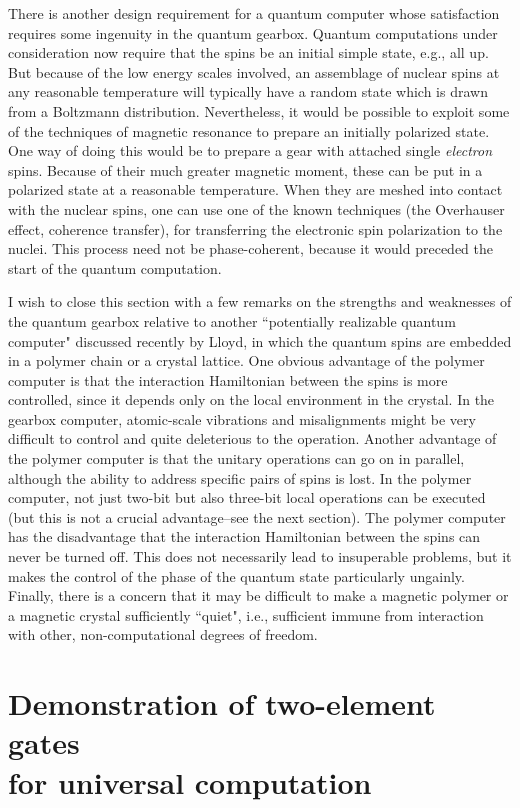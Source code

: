 There is another design requirement for a quantum computer whose satisfaction
requires some ingenuity in
the quantum gearbox.  Quantum computations under consideration
now\cite{Simon,Shor}
require that the spins be an initial simple state,
e.g., all up.  But because of the low energy scales involved, an
assemblage of nuclear spins
at any reasonable temperature
will typically have a random state which is drawn from a Boltzmann
distribution.  Nevertheless, it would be possible to exploit some
of the techniques of magnetic resonance to prepare an initially
polarized state.  One way of doing this would be to prepare a
gear with attached single {\em electron} spins.  Because of their
much greater magnetic moment, these can be put in a polarized state
at a reasonable temperature.  When they are meshed into contact
with the nuclear spins, one can use one of the
known techniques (the
Overhauser effect, coherence transfer\cite{NMR}), for transferring
the electronic spin polarization to the nuclei.  This process
need not be phase-coherent, because it would preceded the start
of the quantum computation.

I wish to close this section with a few remarks on the strengths
and weaknesses of the quantum gearbox relative to another ``potentially
realizable quantum computer" discussed recently by Lloyd\cite{Lloyd},
in which the quantum spins are embedded in a polymer chain or a crystal
lattice.  One obvious advantage of the polymer computer is that the
interaction Hamiltonian between the spins is more controlled, since
it depends only on the local environment in the crystal.  In the
gearbox computer, atomic-scale vibrations and misalignments might
be very difficult to control and quite deleterious to the operation.
Another advantage of the polymer computer is that the unitary operations
can go on in parallel, although the ability to address specific pairs
of spins is lost.  In the polymer computer, not just two-bit but
also three-bit local operations can be executed (but this is not
a crucial advantage--see the next section).  The polymer computer
has the disadvantage that the interaction Hamiltonian between the
spins can never be turned off.  This does not necessarily lead to
insuperable problems, but it makes the control of the phase of
the quantum state particularly ungainly.  Finally, there is a concern
that it may be difficult to make a magnetic polymer or a magnetic
crystal sufficiently ``quiet", i.e., sufficient immune from interaction
with other, non-computational degrees of freedom.

\section{Demonstration of two-element gates\protect \\
for universal computation}
\label{sec:level1}

